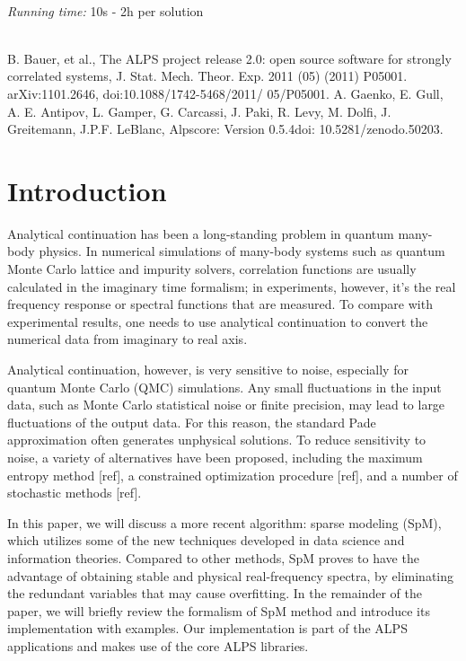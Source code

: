 \documentclass[final,5p,twocolumn,12pt]{elsarticle}
\begin{document}
\begin{small}
   \\
{\em Running time: }10s - 2h per solution\\
   \\
\begin{thebibliography}{0}
B. Bauer, et al., The ALPS project release 2.0: open source software for strongly correlated systems, J. Stat. Mech. Theor. Exp. 2011 (05) (2011) P05001. arXiv:1101.2646, doi:10.1088/1742-5468/2011/ 05/P05001.
A. Gaenko, E. Gull, A. E. Antipov, L. Gamper, G. Carcassi, J. Paki, R. Levy, M. Dolfi, J. Greitemann, J.P.F. LeBlanc, Alpscore: Version 0.5.4doi: 10.5281/zenodo.50203.
\end{thebibliography}
\end{small}

\section{Introduction}
Analytical continuation has been a long-standing problem in quantum many-body physics. In numerical simulations of many-body systems such as quantum Monte Carlo lattice and impurity solvers, correlation functions are usually calculated in the imaginary time formalism; in experiments, however, it's the real frequency response or spectral functions that are measured. To compare with experimental results, one needs to use analytical continuation to convert the numerical data from imaginary to real axis.

Analytical continuation, however, is very sensitive to noise, especially for quantum Monte Carlo (QMC) simulations. Any small fluctuations in the input data, such as Monte Carlo statistical noise or finite precision, may lead to large fluctuations of the output data. For this reason, the standard Pade approximation often generates unphysical solutions. To reduce sensitivity to noise, a variety of alternatives have been proposed, including the maximum entropy method [ref], a constrained optimization procedure [ref], and a number of stochastic methods [ref]. 

In this paper, we will discuss a more recent algorithm: sparse modeling (SpM), which utilizes some of the new techniques developed in data science and information theories. Compared to other methods, SpM proves to have the advantage of obtaining stable and physical real-frequency spectra, by eliminating the redundant variables that may cause overfitting. In the remainder of the paper, we will briefly review the formalism of SpM method and introduce its implementation with examples. Our implementation is part of the ALPS applications and makes use of the core ALPS libraries. 
\end{document}
